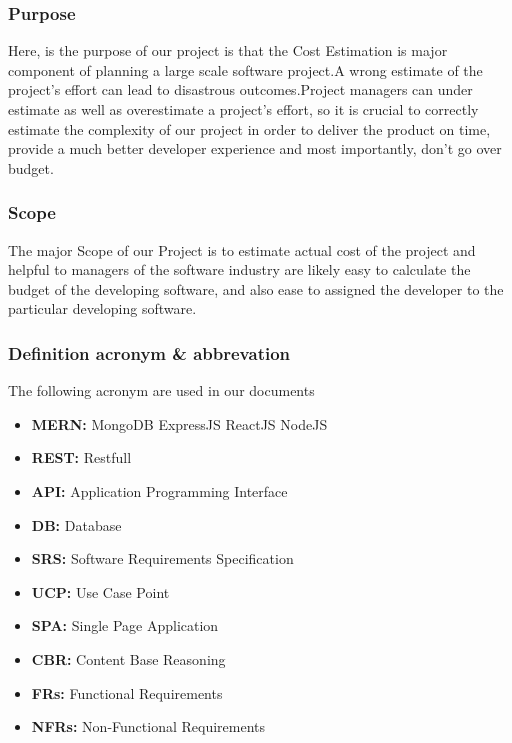     \subsubsection{Purpose}
    Here, is the purpose of our project is that the Cost Estimation is major component
    of planning a large scale software project.A wrong estimate of the project’s effort
    can lead to disastrous outcomes.Project managers can under estimate as well as 
    overestimate a project’s effort, so it is crucial to correctly estimate the 
    complexity of our project in order to deliver the product on time, provide a 
    much better developer experience and most importantly, don’t go over budget.


    \subsubsection{Scope}
    The major Scope of our Project is to estimate actual cost of the project and helpful to managers of the software industry are likely easy to calculate the budget of the developing software, and also ease to assigned the developer to the particular developing software.
    
    \subsubsection{Definition acronym \& abbrevation}
    The following acronym are used in our documents
    \begin{center}
        \begin{itemize}
            \item {\bfseries MERN:} MongoDB ExpressJS ReactJS NodeJS
            \item {\bfseries REST:} Restfull
            \item {\bfseries API:} Application Programming Interface
            \item {\bfseries DB:} Database
            \item {\bfseries SRS:} Software Requirements Specification
            \item {\bfseries UCP:} Use Case Point
            \item {\bfseries SPA:} Single Page Application
            \item {\bfseries CBR:} Content Base Reasoning
            \item {\bfseries FRs:} Functional Requirements
            \item {\bfseries NFRs:} Non-Functional Requirements
            \end{itemize}
    \end{center}
    
